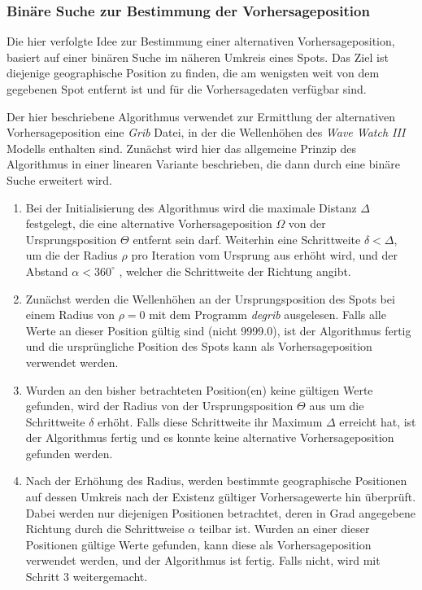 \subsubsection{Binäre Suche zur Bestimmung der Vorhersageposition}

Die hier verfolgte Idee zur Bestimmung einer alternativen
Vorhersageposition, basiert auf einer binären Suche im näheren Umkreis
eines Spots. Das Ziel ist diejenige geographische Position zu finden,
die am wenigsten weit von dem gegebenen Spot entfernt ist und für die
Vorhersagedaten verfügbar sind.

Der hier beschriebene Algorithmus verwendet zur Ermittlung der
alternativen Vorhersageposition eine \textit{Grib} Datei, in der die
Wellenhöhen des \textit{Wave Watch III} Modells enthalten
sind. Zunächst wird hier das allgemeine Prinzip des Algorithmus in
einer linearen Variante beschrieben, die dann durch eine binäre Suche
erweitert wird.

\begin{enumerate}
\item Bei der Initialisierung des Algorithmus wird die maximale
  Distanz $\Delta$ festgelegt, die eine alternative Vorhersageposition
  $\Omega$ von der Ursprungsposition $\Theta$ entfernt sein
  darf. Weiterhin eine Schrittweite $\delta < \Delta$, um die der
  Radius $\rho$ pro Iteration vom Ursprung aus erhöht wird, und der
  Abstand $\alpha < 360^{\circ}$ , welcher die Schrittweite der
  Richtung angibt.

\item Zunächst werden die Wellenhöhen an der Ursprungsposition des
  Spots bei einem Radius von $\rho = 0$ mit dem Programm
  \textit{degrib} ausgelesen. Falls alle Werte an dieser Position
  gültig sind (nicht 9999.0), ist der Algorithmus fertig und die
  ursprüngliche Position des Spots kann als Vorhersageposition
  verwendet werden.

\item Wurden an den bisher betrachteten Position(en) keine gültigen
  Werte gefunden, wird der Radius von der Ursprungsposition $\Theta$
  aus um die Schrittweite $\delta$ erhöht. Falls diese Schrittweite
  ihr Maximum $\Delta$ erreicht hat, ist der Algorithmus fertig und es
  konnte keine alternative Vorhersageposition gefunden werden.

\item Nach der Erhöhung des Radius, werden bestimmte geographische
  Positionen auf dessen Umkreis nach der Existenz gültiger
  Vorhersagewerte hin überprüft. Dabei werden nur diejenigen
  Positionen betrachtet, deren in Grad angegebene Richtung durch die
  Schrittweise $\alpha$ teilbar ist. Wurden an einer dieser Positionen
  gültige Werte gefunden, kann diese als Vorhersageposition verwendet
  werden, und der Algorithmus ist fertig. Falls nicht, wird mit
  Schritt 3 weitergemacht.

\end{enumerate}

